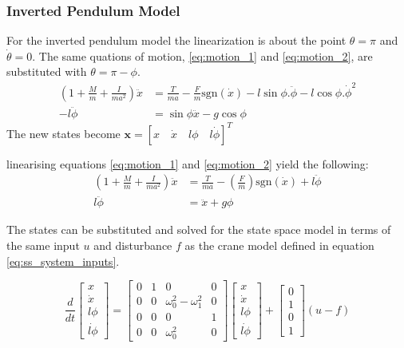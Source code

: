 \documentclass{article}
\begin{document}
\subsubsection{Inverted Pendulum Model}

For the inverted pendulum model the linearization is about the point $\theta = \pi$ and $\dot{\theta} = 0$.
The same quations of motion, \ref{eq:motion_1} and \ref{eq:motion_2}, are substituted with $\theta = \pi - \phi$.
\begin{align}
  \left( 1 + \frac{M}{m} + \frac{I}{ma^2} \right) \ddot{x} &= \frac{T}{ma} - \frac{F}{m}\text{sgn}(\dot{x}) - l\sin\phi . \ddot{\phi} - l\cos\phi . \dot{\phi}^2 \label{eq:motion_1} \\
   - l \ddot{\phi} &= \sin\phi \ddot{x} - g\cos\phi \label{eq:motion_2}
\end{align}
The new states become $\mathbf{x} = \left[ x \quad \dot{x} \quad l\phi \quad l\dot{\phi} \right]^T$


linearising equations \ref{eq:motion_1} and \ref{eq:motion_2} yield the following:
\begin{align}
  \left( 1 + \frac{M}{m} + \frac{I}{ma^2} \right) \ddot{x} &= \frac{T}{ma} - \left(\frac{F}{m} \right)\text{sgn}(\dot{x}) + l \ddot{\phi} \label{eq:invp_motion_1} \\
  l \ddot{\phi} &= \ddot{x} + g\phi \label{eq:invp_motion_2}
\end{align}

The states can be substituted and solved for the state space model in terms of the same input $u$ and disturbance $f$ as the crane model defined in equation \ref{eq:ss_system_inputs}.

\begin{equation}
  \frac{d}{dt} 
  \begin{bmatrix}
     x \\ \dot{x} \\ l\phi \\ \dot{l\phi} \end{bmatrix} = \begin{bmatrix} 
      0 & 1 & 0 & 0 \\ 0 & 0 & \omega_0^2 - \omega_1^2 & 0 \\ 0 & 0 & 0 & 1 \\ 0 & 0 & \omega_0^2 & 0 \end{bmatrix} \begin{bmatrix} 
        x \\ \dot{x} \\ l\phi \\ \dot{l\phi} \end{bmatrix} + \begin{bmatrix} 
          0 \\ 1 \\ 0 \\ 1 \end{bmatrix} (u - f)
\end{equation}
\end{document}
